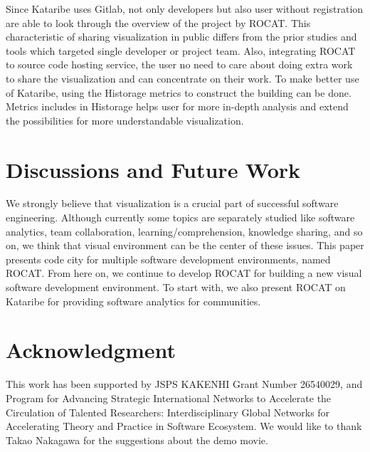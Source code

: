 \documentclass[conference]{IEEEtran}
\begin{document}
Since Kataribe uses Gitlab, not only developers but also user without registration are able to look through the overview of the project by ROCAT.
This characteristic of sharing visualization in public differs from the prior studies and tools which targeted single developer or project team.
Also, integrating ROCAT to source code hosting service, the user no need to care about doing extra work to share the visualization and can concentrate on their work.
To make better use of Kataribe, using the Historage metrics to construct the building can be done.
Metrics includes in Historage helps user for more in-depth analysis and extend the possibilities for more understandable visualization.


\section{Discussions and Future Work}
We strongly believe that visualization is a crucial part of successful software engineering.
Although currently some topics are separately studied like software analytics, team collaboration, learning/comprehension, knowledge sharing, and so on, we think that visual environment can be the center of these issues.
This paper presents code city for multiple software development environments, named ROCAT.
From here on, we continue to develop ROCAT for building a new visual software development environment.
To start with, we also present ROCAT on Kataribe for providing software analytics for communities.

\section*{Acknowledgment}
This work has been supported by JSPS KAKENHI Grant Number 26540029, and Program for Advancing Strategic International Networks to Accelerate the Circulation of Talented Researchers: Interdisciplinary Global Networks for Accelerating Theory and Practice in Software Ecosystem.
We would like to thank Takao Nakagawa for the suggestions about the demo movie.




\end{document}
